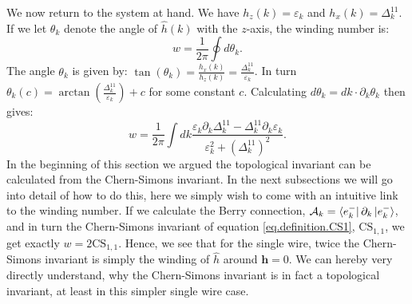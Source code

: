 We now return to the system at hand. We have $h_z(k) = \varepsilon_k$ and $h_x(k) = \Delta^{11}_k$. If we let $\theta_k$ denote the angle of $\hat{h}(k)$ with the $z$-axis, the winding number is:
\begin{equation}
w = \frac{1}{2\pi}\oint d\theta_k.
\label{eq.definition.windingnumber}
\end{equation} 
The angle $\theta_k$ is given by: $\tan(\theta_k) = \frac{h_x(k)}{h_z(k)} = \frac{\Delta^{11}_k}{\varepsilon_k}$. In turn $\theta_k(c) = \arctan\left(\frac{\Delta^{11}_k}{\varepsilon_k}\right) + c$ for some constant $c$. Calculating $d\theta_k = dk \cdot \partial_k \theta_k$ then gives:
\begin{equation}
w = \frac{1}{2\pi}\int dk \frac{\varepsilon_k\partial_k\Delta^{11}_k - \Delta^{11}_k\partial_k\varepsilon_k}{\varepsilon^2_k + (\Delta^{11}_k)^2}.
\label{eq.windingnumber.Kitaevsinglewire}
\end{equation} 
In the beginning of this section we argued the topological invariant can be calculated from the Chern-Simons invariant. In the next subsections we will go into detail of how to do this, here we simply wish to come with an intuitive link to the winding number. If we calculate the Berry connection, $\mathcal{A}_k = \bra{e^{-}_{k}}\partial_k\ket{e^{-}_{k}}$, and in turn the Chern-Simons invariant of equation \eqref{eq.definition.CS1}, $\text{CS}_{1,1}$, we get exactly $w = 2\text{CS}_{1,1}$. Hence, we see that for the single wire, twice the Chern-Simons invariant is simply the winding of $\hat{h}$ around $\mathbf{h} = 0$. We can hereby very directly understand, why the Chern-Simons invariant is in fact a topological invariant, at least in this simpler single wire case. 

